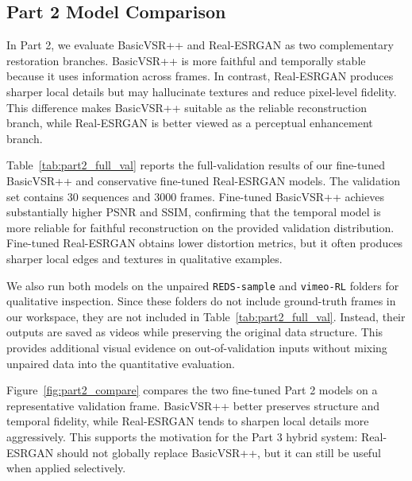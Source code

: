 \subsection{Part 2 Model Comparison}

In Part 2, we evaluate BasicVSR++ and Real-ESRGAN as two complementary restoration branches. BasicVSR++ is more faithful and temporally stable because it uses information across frames. In contrast, Real-ESRGAN produces sharper local details but may hallucinate textures and reduce pixel-level fidelity. This difference makes BasicVSR++ suitable as the reliable reconstruction branch, while Real-ESRGAN is better viewed as a perceptual enhancement branch.

Table~\ref{tab:part2_full_val} reports the full-validation results of our fine-tuned BasicVSR++ and conservative fine-tuned Real-ESRGAN models. The validation set contains 30 sequences and 3000 frames. Fine-tuned BasicVSR++ achieves substantially higher PSNR and SSIM, confirming that the temporal model is more reliable for faithful reconstruction on the provided validation distribution. Fine-tuned Real-ESRGAN obtains lower distortion metrics, but it often produces sharper local edges and textures in qualitative examples.

\begin{table}[t]
\centering
\caption{Part 2 full-validation comparison between fine-tuned BasicVSR++ and conservative fine-tuned Real-ESRGAN.}
\label{tab:part2_full_val}
\end{table}

We also run both models on the unpaired \texttt{REDS-sample} and \texttt{vimeo-RL} folders for qualitative inspection. Since these folders do not include ground-truth frames in our workspace, they are not included in Table~\ref{tab:part2_full_val}. Instead, their outputs are saved as videos while preserving the original data structure. This provides additional visual evidence on out-of-validation inputs without mixing unpaired data into the quantitative evaluation.

Figure~\ref{fig:part2_compare} compares the two fine-tuned Part 2 models on a representative validation frame. BasicVSR++ better preserves structure and temporal fidelity, while Real-ESRGAN tends to sharpen local details more aggressively. This supports the motivation for the Part 3 hybrid system: Real-ESRGAN should not globally replace BasicVSR++, but it can still be useful when applied selectively.

